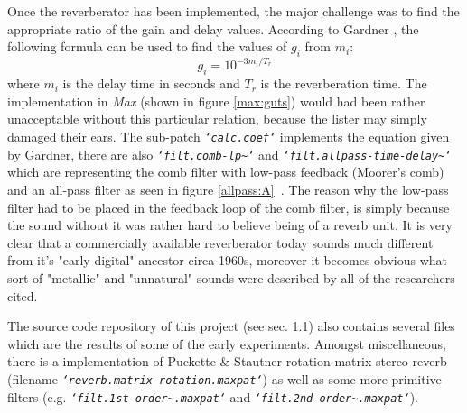 \documentclass[12pt]{report}
\begin{document}
Once the reverberator has been implemented, the major challenge was to find
the appropriate ratio of the gain and delay values. According to Gardner
\cite{gardner1998algorithms}, the following formula can be used to find the
values of $g_i$ from $m_i$:\begin{equation}\label{eq:coef}
  g_i=10^{-3m_i/T_r}
\end{equation}
where $m_i$ is the delay time in seconds and $T_r$ is the reverberation time.
The implementation in \emph{Max} (shown in figure \ref{max:guts}) would had
been rather unacceptable without this particular relation, because the lister
may simply damaged their ears. The sub-patch \emph{\texttt{`calc.coef`}}
implements the equation given by Gardner, there are also \emph{\texttt{`filt.comb-lp\~{}`}} and
\emph{\texttt{`filt.allpass-time-delay\~{}`}} which are representing the comb
filter with low-pass feedback (Moorer's comb) and an all-pass filter as seen
in figure \ref{allpass:A}\ . The reason why the low-pass filter had to be
placed in the feedback loop of the comb filter, is simply because the sound
without it was rather hard to believe being of a reverb unit. It is very clear
that a commercially available reverberator today sounds much different from
it's "early digital" ancestor circa 1960s, moreover it becomes obvious what
sort of "metallic" and "unnatural" sounds were described by all of the
researchers cited.


The source code repository of this project (see sec. 1.1) also contains
several files which are the results of some of the early experiments.
Amongst miscellaneous, there is a implementation of Puckette \& Stautner
rotation-matrix stereo reverb (filename \emph{\texttt{`reverb.matrix-rotation.maxpat`}})
as well as some more primitive filters (e.g. \emph{\texttt{`filt.1st-order\~{}.maxpat`}}
and \emph{\texttt{`filt.2nd-order\~{}.maxpat`}}).
\end{document}
